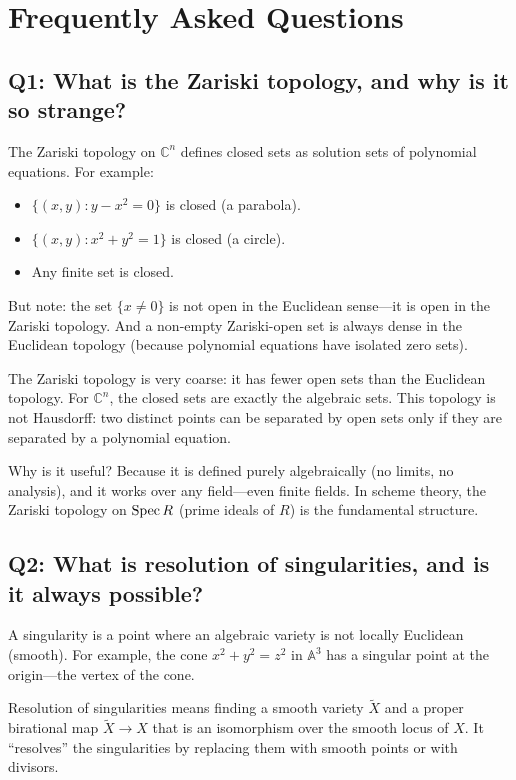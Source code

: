 \section{Frequently Asked Questions}

\subsection*{Q1: What is the Zariski topology, and why is it so strange?}

The Zariski topology on $\mathbb{C}^n$ defines closed sets as solution sets of polynomial equations. For example:
\begin{itemize}
    \item $\{(x,y) : y - x^2 = 0\}$ is closed (a parabola).
    \item $\{(x,y) : x^2 + y^2 = 1\}$ is closed (a circle).
    \item Any finite set is closed.
\end{itemize}

But note: the set $\{x \neq 0\}$ is not open in the Euclidean sense---it is open in the Zariski topology. And a non-empty Zariski-open set is always dense in the Euclidean topology (because polynomial equations have isolated zero sets).

The Zariski topology is very coarse: it has fewer open sets than the Euclidean topology. For $\mathbb{C}^n$, the closed sets are exactly the algebraic sets. This topology is not Hausdorff: two distinct points can be separated by open sets only if they are separated by a polynomial equation.

Why is it useful? Because it is defined purely algebraically (no limits, no analysis), and it works over any field---even finite fields. In scheme theory, the Zariski topology on $\operatorname{Spec} R$ (prime ideals of $R$) is the fundamental structure.

\subsection*{Q2: What is resolution of singularities, and is it always possible?}

A singularity is a point where an algebraic variety is not locally Euclidean (smooth). For example, the cone $x^2 + y^2 = z^2$ in $\mathbb{A}^3$ has a singular point at the origin---the vertex of the cone.

Resolution of singularities means finding a smooth variety $\tilde X$ and a proper birational map $\tilde X \to X$ that is an isomorphism over the smooth locus of $X$. It ``resolves'' the singularities by replacing them with smooth points or with divisors.

